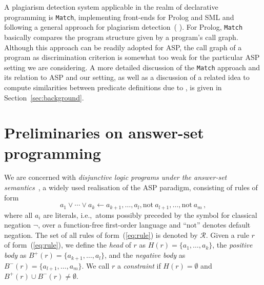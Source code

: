 \documentclass{tlp}
\newcommand{\naf}{\ensuremath{\mathrm{not}}}
\newcommand{\la}{\leftarrow}
\newcommand{\iec}[0]{i.e.,\ }
\newcommand{\head}[1]{\mathit{H}(#1)}
\newcommand{\posbody}[1]{\mathit{B^{+}}(#1)}
\newcommand{\negbody}[1]{\mathit{B^{-}}(#1)}
\newcommand{\rules}{\mathcal{R}}
\begin{document}
A plagiarism detection system applicable in the realm of declarative programming is \texttt{Match}, implementing front-ends for Prolog and SML and following a general approach for plagiarism detection~( ). 
For Prolog, \texttt{Match} basically compares the  program structure given by a  program's call graph.
Although this approach can be readily adopted for ASP, the call graph of a program as discrimination criterion is somewhat too weak for the particular ASP setting we are considering.
A more detailed discussion of the {\tt Match} approach and its relation to ASP and our setting, as well as a discussion of a related idea to
compute similarities between predicate definitions due to , is given in Section~\ref{sec:background}.

\section{Preliminaries on answer-set programming}\label{sec:prel}


We are concerned with \emph{disjunctive logic programs under the answer-set semantics}~\cite{gelf-lifs-91}, a widely used realisation of the ASP paradigm, consisting of 
rules of form
\begin{equation}\label{eq:rule}
a_{1} \vee \cdots \vee a_{k} \la a_{k+1}, \ldots, a_{l}, \naf\ a_{l+1}, \ldots, \naf\ a_{m}\,, 
\end{equation}
where all $a_{i}$ are literals, 
\iec atoms possibly preceded by the symbol for classical negation $\neg$,
over a function-free first-order language
and ``$\naf$'' denotes default negation.
The set of all rules of form~(\ref{eq:rule}) is denoted by $\rules$.
Given a rule $r$ of form~(\ref{eq:rule}), we define the \emph{head} of $r$ as
$\head{r}=\{a_{1}, \ldots, a_{k} \}$, the \emph{positive body} as $\posbody{r}=\{a_{k+1}, \ldots, a_{l}\}$, and the \emph{negative body} as $\negbody{r}=\{a_{l+1}, \ldots, a_{m}\}$.
We call $r$ a \emph{constraint} if $\head{r}=\emptyset$ and $\posbody{r}\cup\negbody{r}\neq\emptyset$.
\end{document}

